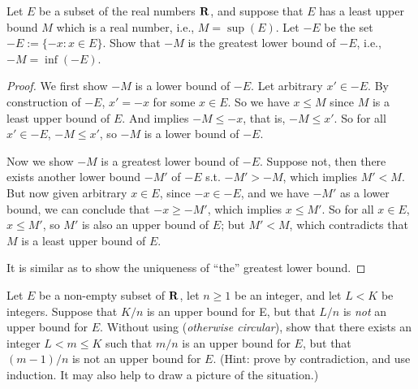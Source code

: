 \exercisesection

\begin{exercise} \label{exercise 5.5.1}
Let \(E\) be a subset of the real numbers \(\mathbf{R}\), and suppose that \(E\) has a least upper bound \(M\) which is a real number, i.e., \(M = \sup(E)\).
Let \(-E\) be the set \(-E := \{-x : x \in E\} \).
Show that \(-M\) is the greatest lower bound of \(-E\), i.e., \(-M = \inf(-E)\).
\end{exercise}

\begin{proof}
We first show \(-M\) is a lower bound of \(-E\).
Let arbitrary \(x' \in -E\).
By construction of \(-E\), \(x' = -x\) for some \(x \in E\).
So we have \(x \le M\)  since \(M\) is a least upper bound of \(E\).
And  implies \(-M \le -x\), that is, \(-M \le x'\).
So for all \(x' \in -E\), \(-M \le x'\), so \(-M\) is a lower bound of \(-E\).

Now we show \(-M\) is a greatest lower bound of \(-E\).
Suppose not, then there exists another lower bound \(-M'\) of \(-E\) s.t. \(-M' > -M\), which implies \(M' < M\).
But now given arbitrary \(x \in E\), since \(-x \in -E\), and we have \(-M'\) as a lower bound, we can conclude that \(-x \ge -M'\), which implies \(x \le M'\).
So for all \(x \in E\), \(x \le M'\), so \(M'\) is also an upper bound of \(E\);
but \(M' < M\), which contradicts that \(M\) is a least upper bound of \(E\).

It is similar as  to show the uniqueness of ``the'' greatest lower bound.
\end{proof}

\begin{exercise} \label{exercise 5.5.2}
Let \(E\) be a non-empty subset of \(\mathbf{R}\), let \(n \ge 1\) be an integer, and let \(L < K\) be integers.
Suppose that \(K/n\) is an upper bound for E, but that \(L/n\) is \emph{not} an upper bound for \(E\).
Without using (\emph{otherwise circular}), show that there exists an integer \(L < m \le K\) such that \(m/n\) is an upper bound for \(E\), but that \((m - 1)/n\) is not an upper bound for \(E\).
(Hint: prove by contradiction, and use induction.
It may also help to draw a picture of the situation.)
\end{exercise}

